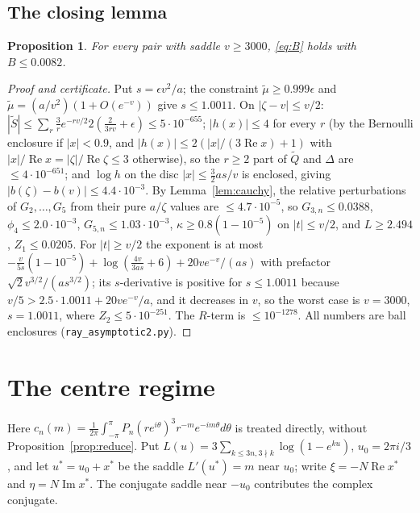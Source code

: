\documentclass[11pt,reqno]{amsart}
\theoremstyle{plain}
\newtheorem{proposition}[theorem]{Proposition}
\theoremstyle{definition}
\newcommand{\St}{\widetilde S}
\newcommand{\Qt}{\widetilde Q}
\renewcommand{\Re}{\operatorname{Re}}
\renewcommand{\Im}{\operatorname{Im}}
\begin{document}
\subsection{The closing lemma}\label{sec:closing}

\begin{proposition}\label{prop:closing}
For every pair with saddle $v\ge3000$, \eqref{eq:B} holds with $B\le0.0082$.
\end{proposition}
\begin{proof}[Proof and certificate]
Put $s=\epsilon v^2/a$; the constraint $\widetilde\mu\ge0.999\epsilon$ and $\widetilde\mu=(a/v^2)(1+O(e^{-v}))$ give $s\le1.0011$.
On $|\zeta-v|\le v/2$: $|\St|\le\sum_r\frac3re^{-rv/2}2(\frac2{3rv}+\epsilon)\le5\cdot10^{-655}$; $|h(x)|\le4$ for every $r$ (by the
Bernoulli enclosure if $|x|<0.9$, and $|h(x)|\le2(|x|/(3\Re x)+1)$ with $|x|/\Re x=|\zeta|/\Re\zeta\le3$ otherwise), so the
$r\ge2$ part of $\Qt$ and $\Delta$ are $\le4\cdot10^{-651}$; and $\log h$ on the disc $|x|\le\frac32as/v$ is enclosed, giving
$|b(\zeta)-b(v)|\le4.4\cdot10^{-3}$. By Lemma~\ref{lem:cauchy}, the relative perturbations of $G_2,\dots,G_5$ from their pure
$a/\zeta$ values are $\le4.7\cdot10^{-5}$, so $G_{3,n}\le0.0388$, $\phi_4\le2.0\cdot10^{-3}$, $G_{5,n}\le1.03\cdot10^{-3}$,
$\kappa\ge0.8(1-10^{-5})$ on $|t|\le v/2$, and $L\ge2.494$, $Z_1\le0.0205$. For $|t|\ge v/2$ the exponent is at most
$-\frac{v}{5s}(1-10^{-5})+\log(\frac{4v}{3as}+6)+20ve^{-v}/(as)$ with prefactor $\sqrt2v^{3/2}/(as^{3/2})$; its $s$-derivative is positive
for $s\le1.0011$ because $v/5>2.5\cdot1.0011+20ve^{-v}/a$, and it decreases in $v$, so the worst case is $v=3000$, $s=1.0011$, where
$Z_2\le5\cdot10^{-251}$. The $R$-term is $\le10^{-1278}$. All numbers are ball enclosures (\texttt{ray\_asymptotic2.py}).
\end{proof}

\section{The centre regime}\label{sec:centre}

Here $c_n(m)=\frac1{2\pi}\int_{-\pi}^{\pi}P_n(re^{i\theta})^3r^{-m}e^{-im\theta}d\theta$ is treated directly, without
Proposition~\ref{prop:reduce}. Put $L(u)=3\sum_{k\le3n,3\nmid k}\log(1-e^{ku})$, $u_0=2\pi i/3$, and let $u^*=u_0+x^*$ be the saddle
$L'(u^*)=m$ near $u_0$; write $\xi=-N\Re x^*$ and $\eta=N\Im x^*$. The conjugate saddle near $-u_0$ contributes the complex conjugate.
\end{document}
